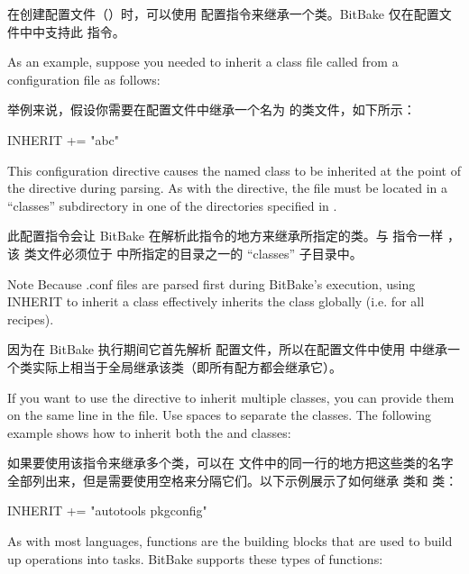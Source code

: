 在创建配置文件（）时，可以使用  配置指令来继承一个类。BitBake 仅在配置文件中中支持此  指令。

As an example, suppose you needed to inherit a class file called  from a configuration file as follows:

举例来说，假设你需要在配置文件中继承一个名为  的类文件，如下所示：

\begin{pyglist}
INHERIT += "abc"
\end{pyglist}

This configuration directive causes the named class to be inherited at the point of the directive during parsing. As with the  directive, the  file must be located in a ``classes'' subdirectory in one of the directories specified in .

此配置指令会让 BitBake 在解析此指令的地方来继承所指定的类。与  指令一样 ，该  类文件必须位于  中所指定的目录之一的 ``classes'' 子目录中。

\begin{noteblock}{Note}%
Because .conf files are parsed first during BitBake's execution, using INHERIT to inherit a class effectively inherits the class globally (i.e. for all recipes).

\medskip
因为在 BitBake 执行期间它首先解析  配置文件，所以在配置文件中使用  中继承一个类实际上相当于全局继承该类（即所有配方都会继承它）。
\end{noteblock}

If you want to use the directive to inherit multiple classes, you can provide them on the same line in the  file. Use spaces to separate the classes. The following example shows how to inherit both the  and  classes:

如果要使用该指令来继承多个类，可以在  文件中的同一行的地方把这些类的名字全部列出来，但是需要使用空格来分隔它们。以下示例展示了如何继承  类和  类：

\begin{pyglist}
INHERIT += "autotools pkgconfig"
\end{pyglist}

\label{section:Functions}

As with most languages, functions are the building blocks that are used to build up operations into tasks. BitBake supports these types of functions:

